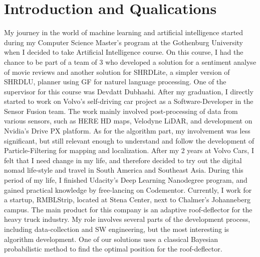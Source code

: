 \documentclass[12pt]{article}
\begin{document}
\maketitle


\section*{Introduction and Qualications}
My journey in the world of machine learning and artificial intelligence started during my Computer Science Master's program at the Gothenburg University when I decided to take Artificial Intelligence course. On this course, I had the chance to be part of a team of 3 who developed a solution for a sentiment analyse of movie reviews and another solution for SHRDLite, a simpler version of SHRDLU\cite{win1970shrdlu}, planner using GF for naturel language processing. One of the supervisor for this course was Devdatt Dubhashi.
After my graduation, I directly started to work on Volvo's self-driving car project as a Software-Developer in the Sensor Fusion team. The work mainly involved post-processing of data from various sensors, such as HERE HD maps, Velodyne LiDAR, and development on Nvidia's Drive PX platform. As for the algorithm part, my involvement was less significant, but still relevant enough to understand and follow the development of Particle-Filtering for mapping and localization.
After my 2 years at Volvo Cars, I felt that I need change in my life, and therefore decided to try out the digital nomad life-style and travel in South America and Southeast Asia. During this period of my life, I finished Udacity's Deep Learning Nanodegree program, and gained practical knowledge by free-lancing on Codementor.
Currently, I work for a startup, RMBLStrip, located at Stena Center, next to Chalmer's Johanneberg campus. The main product for this company is an adaptive roof-deflector for the heavy truck industry. My role involves several parts of the development process, including data-collection and SW engineering, but the most interesting is algorithm development. One of our solutions uses a classical Bayesian probabilistic method to find the optimal position for the roof-deflector.
\end{document}
